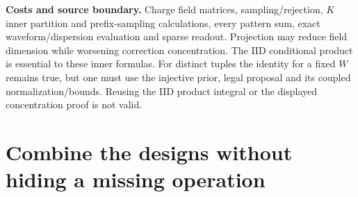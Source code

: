 \documentclass[10pt,a4paper]{article}
\begin{document}
\textbf{Costs and source boundary.} Charge field matrices, sampling/rejection, $K$ inner partition and
prefix-sampling calculations, every pattern sum, exact waveform/dispersion evaluation and sparse readout.
Projection may reduce field dimension while worsening correction concentration.
The IID conditional product is essential to these inner formulas. For distinct tuples the identity
for a fixed $W$ remains true, but one must use the injective prior, legal proposal and its coupled
normalization/bounds. Reusing the IID product integral or the displayed concentration proof is not valid.

\clearpage
\section{Combine the designs without hiding a missing operation}
\label{sec:combinations}
\end{document}

